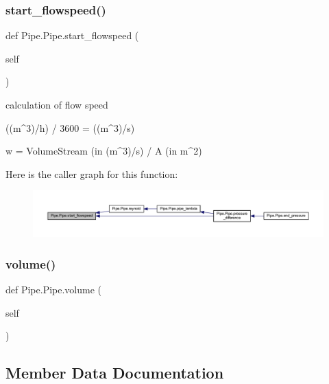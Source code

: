 \subsubsection{\texorpdfstring{start\+\_\+flowspeed()}{start\_flowspeed()}}
{\footnotesize\ttfamily def Pipe.\+Pipe.\+start\+\_\+flowspeed (\begin{DoxyParamCaption}\item[{}]{self }\end{DoxyParamCaption})}

\begin{DoxyVerb}calculation of flow speed

((m^3)/h) / 3600 = ((m^3)/s)

w = VolumeStream (in (m^3)/s) / A (in m^2)
\end{DoxyVerb}
 Here is the caller graph for this function\+:
\nopagebreak
\begin{figure}[H]
\begin{center}
\leavevmode
\includegraphics[width=350pt]{class_pipe_1_1_pipe_a184f926c3aee89e94c19b003d6cc9416_icgraph}
\end{center}
\end{figure}
\mbox{\label{class_pipe_1_1_pipe_a2fdfff20143b09a5c32f335bf55edebc}} 
\subsubsection{\texorpdfstring{volume()}{volume()}}
{\footnotesize\ttfamily def Pipe.\+Pipe.\+volume (\begin{DoxyParamCaption}\item[{}]{self }\end{DoxyParamCaption})}



\subsection{Member Data Documentation}
\mbox{\label{class_pipe_1_1_pipe_a721626d39e9fa569ff1bea20d43d6891}} 
